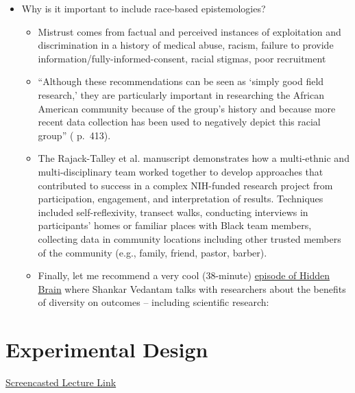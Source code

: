 \documentclass[
  english,
]{book}
\providecommand{\tightlist}{%
  \setlength{\itemsep}{0pt}\setlength{\parskip}{0pt}}
\begin{document}
\begin{itemize}
\tightlist
\item
  Why is it important to include race-based epistemologies?

  \begin{itemize}
  \tightlist
  \item
    Mistrust comes from factual and perceived instances of exploitation and discrimination in a history of medical abuse, racism, failure to provide information/fully-informed-consent, racial stigmas, poor recruitment \citep{rajack-talley_epistemological_2017}
  \item
    ``Although these recommendations can be seen as `simply good field research,' they are particularly important in researching the African American community because of the group's history and because more recent data collection has been used to negatively depict this racial group'' (\citep{rajack-talley_epistemological_2017} p.~413).
  \item
    The Rajack-Talley et al. \citeyearpar{rajack-talley_epistemological_2017} manuscript demonstrates how a multi-ethnic and multi-disciplinary team worked together to develop approaches that contributed to success in a complex NIH-funded research project from participation, engagement, and interpretation of results. Techniques included self-reflexivity, transect walks, conducting interviews in participants' homes or familiar places with Black team members, collecting data in community locations including other trusted members of the community (e.g., family, friend, pastor, barber).
  \item
    Finally, let me recommend a very cool (38-minute) \href{https://www.npr.org/2020/07/27/895858974/creativity-and-diversity-how-exposure-to-different-people-affects-our-thinking}{episode of Hidden Brain} where Shankar Vedantam talks with researchers about the benefits of diversity on outcomes -- including scientific research:
  \end{itemize}
\end{itemize}

\hypertarget{Experimental}{%
\chapter{Experimental Design}\label{Experimental}}

\href{https://spu.hosted.panopto.com/Panopto/Pages/Viewer.aspx?pid=8b4b668f-3ec7-4c20-93de-ac4a01874ff4}{Screencasted Lecture Link}
\end{document}
